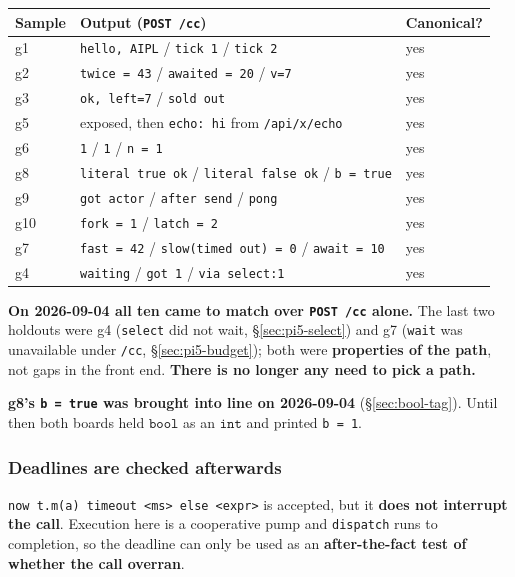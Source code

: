 \documentclass[11pt,a4paper]{article}
\newcommand{\ty}[1]{\ensuremath{\mathtt{#1}}}
\begin{document}
\begin{center}
\small
\begin{tabular}{@{}lll@{}}
\toprule
Sample & Output (\texttt{POST /cc}) & Canonical? \\
\midrule
g1 & \texttt{hello, AIPL} / \texttt{tick 1} / \texttt{tick 2} & yes \\
g2 & \texttt{twice = 43} / \texttt{awaited = 20} / \texttt{v=7} & yes \\
g3 & \texttt{ok, left=7} / \texttt{sold out} & yes \\
g5 & exposed, then \texttt{echo: hi} from \texttt{/api/x/echo} & yes \\
g6 & \texttt{1} / \texttt{1} / \texttt{n = 1} & yes \\
g8 & \texttt{literal true ok} / \texttt{literal false ok} / \texttt{b = true} & yes \\
g9 & \texttt{got actor} / \texttt{after send} / \texttt{pong} & yes \\
g10 & \texttt{fork  = 1} / \texttt{latch = 2} & yes \\
g7 & \texttt{fast = 42} / \texttt{slow(timed out) = 0} / \texttt{await = 10} & yes \\
g4 & \texttt{waiting} / \texttt{got 1} / \texttt{via select:1} & yes \\
\bottomrule
\end{tabular}
\end{center}

\textbf{On 2026-09-04 all ten came to match over \texttt{POST /cc} alone.} The last
two holdouts were g4 (\texttt{select} did not wait, \S\ref{sec:pi5-select}) and g7
(\texttt{wait} was unavailable under \texttt{/cc}, \S\ref{sec:pi5-budget}); both were
\textbf{properties of the path}, not gaps in the front end.
\textbf{There is no longer any need to pick a path.}

\textbf{g8's \texttt{b = true} was brought into line on 2026-09-04}
(\S\ref{sec:bool-tag}). Until then both boards held \ty{bool} as an \ty{int} and
printed \texttt{b = 1}.

\subsubsection*{Deadlines are checked afterwards}
\label{sec:pi5-deadline}

\texttt{now t.m(a) timeout <ms> else <expr>} is accepted, but it
\textbf{does not interrupt the call}. Execution here is a cooperative pump and
\texttt{dispatch} runs to completion, so the deadline can only be used as an
\textbf{after-the-fact test of whether the call overran}.
\end{document}
